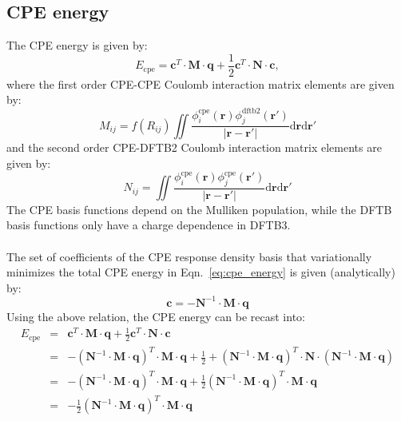 \documentclass{article}
\numberwithin{equation}{section}
\begin{document}
\subsection{CPE energy}
The CPE energy is given by:\cite{cpekaminski}
\begin{equation}
    E_{\mathrm{cpe}} = \mathbf{c}^T \cdot \mathbf{M} \cdot \mathbf{q} + \frac{1}{2} \mathbf{c}^T \cdot \mathbf{N} \cdot \mathbf{c},\label{eq:cpe_energy}
\end{equation}
where the first order CPE-CPE Coulomb interaction matrix elements are given by:
\begin{equation}
    M_{ij} = f(R_{ij})\iint \frac{\phi_i^\mathrm{cpe}\left(\mathbf{r}\right)\phi_j^\mathrm{dftb2}\left(\mathbf{r'}\right)}{\left| \mathbf{r} - \mathbf{r'}\right|} \mathrm{d}\mathbf{r}\mathrm{d}\mathbf{r'}
\end{equation}
and the second order CPE-DFTB2 Coulomb interaction matrix elements are given by:
\begin{equation}
    N_{ij} = \iint \frac{\phi_i^\mathrm{cpe}\left(\mathbf{r}\right)\phi_j^\mathrm{cpe}\left(\mathbf{r'}\right)}{\left| \mathbf{r} - \mathbf{r'}\right|} \mathrm{d}\mathbf{r}\mathrm{d}\mathbf{r'}
\end{equation}
The CPE basis functions depend on the Mulliken population, while the DFTB basis functions only have a charge dependence in DFTB3.
\\\\The set of coefficients of the CPE response density basis that variationally minimizes the total CPE energy in Eqn.~\ref{eq:cpe_energy} is given (analytically) by:
\begin{equation}
    \mathbf{c}= -\mathbf{N}^{-1} \cdot \mathbf{M} \cdot \mathbf{q}
\end{equation}
Using the above relation, the CPE energy can be recast into:
\begin{eqnarray}
    E_{\mathrm{cpe}}
    &=& \mathbf{c}^T \cdot \mathbf{M} \cdot \mathbf{q} + \frac{1}{2} \mathbf{c}^T \cdot \mathbf{N} \cdot \mathbf{c} \\
    &=& -(\mathbf{N}^{-1} \cdot \mathbf{M} \cdot \mathbf{q})^T \cdot \mathbf{M} \cdot \mathbf{q} + \frac{1}{2} + (\mathbf{N}^{-1} \cdot \mathbf{M} \cdot \mathbf{q})^T \cdot \mathbf{N} \cdot (\mathbf{N}^{-1} \cdot \mathbf{M} \cdot \mathbf{q})\\
    &=& -(\mathbf{N}^{-1} \cdot \mathbf{M} \cdot \mathbf{q})^T \cdot \mathbf{M} \cdot \mathbf{q} + \frac{1}{2} (\mathbf{N}^{-1} \cdot \mathbf{M} \cdot \mathbf{q})^T  \cdot \mathbf{M} \cdot \mathbf{q}\\
    &=& -\frac{1}{2} (\mathbf{N}^{-1} \cdot \mathbf{M} \cdot \mathbf{q})^T  \cdot \mathbf{M} \cdot \mathbf{q}
\end{eqnarray}
\end{document}
